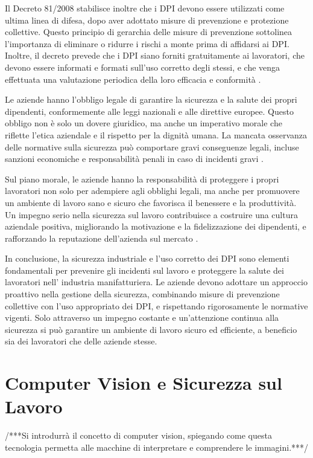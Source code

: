 Il Decreto 81/2008 stabilisce inoltre che i DPI devono essere utilizzati come ultima linea di difesa, dopo aver adottato misure di prevenzione e protezione collettive. Questo principio di gerarchia delle misure di prevenzione sottolinea l'importanza di eliminare o ridurre i rischi a monte prima di affidarsi ai DPI. Inoltre, il decreto prevede che i DPI siano forniti gratuitamente ai lavoratori, che devono essere informati e formati sull'uso corretto degli stessi, e che venga effettuata una valutazione periodica della loro efficacia e conformità \cite{decreto81}.

Le aziende hanno l'obbligo legale di garantire la sicurezza e la salute dei propri dipendenti, conformemente alle leggi nazionali e alle direttive europee. Questo obbligo non è solo un dovere giuridico, ma anche un imperativo morale che riflette l'etica aziendale e il rispetto per la dignità umana. La mancata osservanza delle normative sulla sicurezza può comportare gravi conseguenze legali, incluse sanzioni economiche e responsabilità penali in caso di incidenti gravi \cite{decreto81}.

Sul piano morale, le aziende hanno la responsabilità di proteggere i propri lavoratori non solo per adempiere agli obblighi legali, ma anche per promuovere un ambiente di lavoro sano e sicuro che favorisca il benessere e la produttività. Un impegno serio nella sicurezza sul lavoro contribuisce a costruire una cultura aziendale positiva, migliorando la motivazione e la fidelizzazione dei dipendenti, e rafforzando la reputazione dell'azienda sul mercato \cite{valoresicurezza}.

In conclusione, la sicurezza industriale e l'uso corretto dei DPI sono elementi fondamentali per prevenire gli incidenti sul lavoro e proteggere la salute dei lavoratori nell' industria manifatturiera. Le aziende devono adottare un approccio proattivo nella gestione della sicurezza, combinando misure di prevenzione collettive con l'uso appropriato dei DPI, e rispettando rigorosamente le normative vigenti. Solo attraverso un impegno costante e un'attenzione continua alla sicurezza si può garantire un ambiente di lavoro sicuro ed efficiente, a beneficio sia dei lavoratori che delle aziende stesse.


\section{Computer Vision e Sicurezza sul Lavoro}

/***Si introdurrà il concetto di computer vision, spiegando come questa tecnologia permetta alle macchine di interpretare e comprendere le immagini.***/

